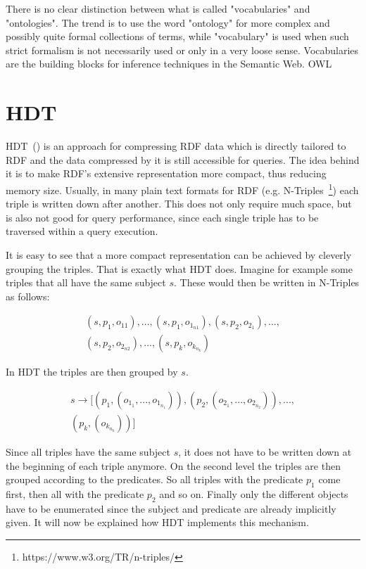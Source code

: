 There is no clear distinction between what is called "vocabularies" and "ontologies". The trend is to use the word "ontology" for more complex and possibly quite formal collections of terms, while "vocabulary" is used when such strict formalism is not necessarily used or only in a very loose sense. Vocabularies are the building blocks for inference techniques in the Semantic Web.
\ac{OWL} 

\section{HDT}\label{related_work_hdt}

HDT~(\cite{hdt}) is an approach for compressing RDF data which is directly tailored to RDF and the data compressed by it is still accessible for queries. The idea behind it is to make RDF's extensive representation more compact, thus reducing memory size. Usually, in many plain text formats for RDF (e.g. N-Triples~\footnote{https://www.w3.org/TR/n-triples/}) each triple is written down after another. This does not only require much space, but is also not good for query performance, since each single triple has to be traversed within a query execution.

It is easy to see that a more compact representation can be achieved by cleverly grouping the triples. That is exactly what HDT does. Imagine for example some triples that all have the same subject $s$. These would then be written in N-Triples as follows:

\begin{align*}
(s,p_1,o_{11}),...,(s,p_1,o_{1_{n1}}),(s,p_2,o_{2_1}),...,\\
	(s,p_2,o_{2_{n2}}),...,(s,p_k,o_{k_{n_k}})
\end{align*}

In HDT the triples are then grouped by $s$.

\begin{align*}
s \to [(p_1,(o_{1_1},...,o_{1_{n_1}})),(p_2,(o_{2_1},...,o_{2_{n_2}})),...,\\
 (p_k , (o_{k_{n_k}} ))]
\end{align*}

Since all triples have the same subject $s$, it does not have to be written down at the beginning of each triple anymore. On the second level the triples are then grouped according to the predicates. So all triples with the predicate $p_1$ come first, then all with the predicate $p_2$ and so on. Finally only the different objects have to be enumerated since the subject and predicate are already implicitly given. It will now be explained how HDT implements this mechanism.

